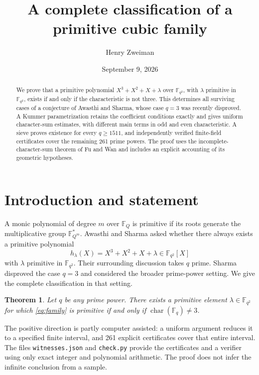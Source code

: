 \documentclass[11pt]{article}
\title{A complete classification of a primitive cubic family}
\author{Henry Zweiman}
\date{September 9, 2026}
\newtheorem{theorem}{Theorem}[section]
\theoremstyle{remark}\newtheorem{remark}[theorem]{Remark}
\newcommand{\F}{\mathbb F}
\begin{document}
\maketitle
\begin{abstract}
We prove that a primitive polynomial $X^3+X^2+X+\lambda$ over $\F_{q^2}$, with $\lambda$ primitive in $\F_{q^2}$, exists if and only if the characteristic is not three. This determines all surviving cases of a conjecture of Awasthi and Sharma, whose case $q=3$ was recently disproved. A Kummer parametrization retains the coefficient conditions exactly and gives uniform character-sum estimates, with different main terms in odd and even characteristic. A sieve proves existence for every $q\ge1511$, and independently verified finite-field certificates cover the remaining 261 prime powers. The proof uses the incomplete-character-sum theorem of Fu and Wan and includes an explicit accounting of its geometric hypotheses.
\end{abstract}

\section{Introduction and statement}

A monic polynomial of degree $m$ over $\F_Q$ is primitive if its roots generate the multiplicative group $\F_{Q^m}^*$. Awasthi and Sharma \cite[Conjecture 9.1]{AS} asked whether there always exists a primitive polynomial
\begin{equation}\label{eq:family}
 h_\lambda(X)=X^3+X^2+X+\lambda\in\F_{q^2}[X]
\end{equation}
with $\lambda$ primitive in $\F_{q^2}$. Their surrounding discussion takes $q$ prime. Sharma \cite[Section 4]{S} disproved the case $q=3$ and considered the broader prime-power setting. We give the complete classification in that setting.

\begin{theorem}\label{thm:main}
Let $q$ be any prime power. There exists a primitive element $\lambda\in\F_{q^2}$ for which \eqref{eq:family} is primitive if and only if $\operatorname{char}(\F_q)\ne3$.
\end{theorem}

The positive direction is partly computer assisted: a uniform argument reduces it to a specified finite interval, and 261 explicit certificates cover that entire interval. The files \texttt{witnesses.json} and \texttt{check.py} provide the certificates and a verifier using only exact integer and polynomial arithmetic. The proof does not infer the infinite conclusion from a sample.
\end{document}

